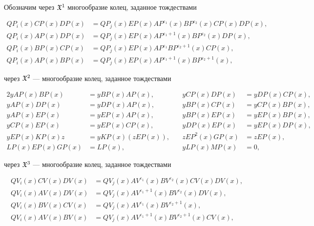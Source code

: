 Обозначим через $\frak X^1$ многообразие колец, заданное тождествами 


\begin{align*} 


QP_i(x)CP(x)DP(x)&=QP_j(x)EP(x)AP^{\varepsilon_1}(x) 


BP^{\varepsilon_2}(x)CP(x)DP(x), \\ 


QP_i(x)AP(x)DP(x)&=QP_j(x)EP(x)AP^{\varepsilon_1+1}(x) 


BP^{\varepsilon_2}(x)DP(x), \\ 


QP_i(x)BP(x)CP(x)&=QP_j(x)EP(x)AP^{\varepsilon_1} 


BP^{\varepsilon_2+1}(x)CP(x), \\ 


QP_i(x)AP(x)BP(x)&=QP_j(x)EP(x)AP^{\varepsilon_1+1}(x) 


BP^{\varepsilon_2+1}(x), 


\end{align*} 


через $\frak X^2$ --- многообразие колец, заданное тождествами 


\begin{alignat*}{2} 


yAP(x)BP(x)&=yBP(x)AP(x), &\quad yCP(x)DP(x)&=yDP(x)CP(x), \\ 


yAP(x)DP(x)&=yDP(x)AP(x), &\quad yBP(x)CP(x)&=yCP(x)BP(x), \\ 


yAP(x)EP(x)&=yEP(x)AP(x), &\quad yBP(x)EP(x)&=yEP(x)BP(x), \\ 


yCP(x)EP(x)&=yEP(x)CP(x), &\quad yDP(x)EP(x)&=yEP(x)DP(x), \\ 


yEP(x)KP(x)z&=yKP(x)(zEP(x)), &\quad zEP^2(x)GP(x)&=zEP(x), \\ 


LP(x)EP(x)GP(x)&=LP(x), &\quad yLP(x)MP(x)&=0, 


\end{alignat*} 


через $\frak X^3$ --- многообразие колец, заданное тождествами 


\begin{align*} 


QV_i(x)CV(x)DV(x)&=QV_j(x)AV^{\varepsilon_1}(x) 


BV^{\varepsilon_2}(x)CV(x)DV(x), \\ 


QV_i(x)AV(x)DV(x)&=QV_j(x)AV^{\varepsilon_1+1}(x) 


BV^{\varepsilon_2}(x)DV(x), \\ 


QV_i(x)BV(x)CV(x)&=QV_j(x)AV^{\varepsilon_1}(x) 


BV^{\varepsilon_2+1}(x), \\ 


QV_i(x)AV(x)BV(x)&=QV_j(x)AV^{\varepsilon_1+1}(x) 


BV^{\varepsilon_2+1}(x)CV(x), 


\end{align*} 


